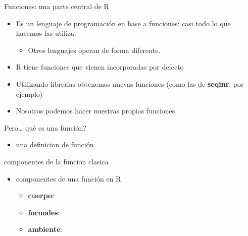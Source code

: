 \documentclass[ignorenonframetext,]{beamer}
\providecommand{\tightlist}{%
  \setlength{\itemsep}{0pt}\setlength{\parskip}{0pt}}
\begin{document}
\begin{frame}{Funciones: una parte central de R}
\protect\hypertarget{funciones-una-parte-central-de-r}{}

\begin{itemize}
\tightlist
\item
  Es un lenguaje de programación en base a funciones: casi todo lo que
  hacemos las utiliza.

  \begin{itemize}
  \tightlist
  \item
    Otros lenguajes operan de forma diferente.
  \end{itemize}
\item
  R tiene funciones que vienen incorporadas por defecto
\item
  Utilizando librerías obtenemos nuevas funciones (como las de
  \textbf{seqinr}, por ejemplo)
\item
  Nosotros podemos hacer nuestras propias funciones
\end{itemize}

\end{frame}

\begin{frame}{Pero\ldots{} qué es una función?}
\protect\hypertarget{pero-quuxe9-es-una-funciuxf3n}{}

\begin{itemize}
\tightlist
\item
  una definicion de función
\end{itemize}

\end{frame}

\begin{frame}{componentes de la funcion clasica}
\protect\hypertarget{componentes-de-la-funcion-clasica}{}

\begin{itemize}
\tightlist
\item
  componentes de una función en R

  \begin{itemize}
  \tightlist
  \item
    \textbf{cuerpo}:
  \item
    \textbf{formales}:
  \item
    \textbf{ambiente}:
  \end{itemize}
\end{itemize}

\end{frame}
\end{document}
